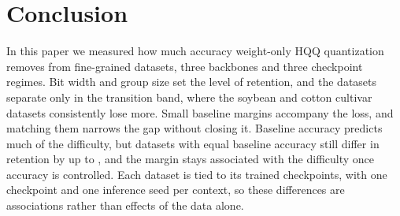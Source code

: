 \section{Conclusion}
\label{sec:conclusion}

In this paper we measured how much accuracy weight-only HQQ quantization removes from  fine-grained datasets, three backbones and three checkpoint regimes.
Bit width and group size set the level of retention, and the datasets separate only in the transition band, where the soybean and cotton cultivar datasets consistently lose more.
Small baseline margins accompany the loss, and matching them narrows the gap without closing it.
Baseline accuracy predicts much of the difficulty, but datasets with equal baseline accuracy still differ in retention by up to , and the margin stays associated with the difficulty once accuracy is controlled.
Each dataset is tied to its trained checkpoints, with one checkpoint and one inference seed per context, so these differences are associations rather than effects of the data alone.
